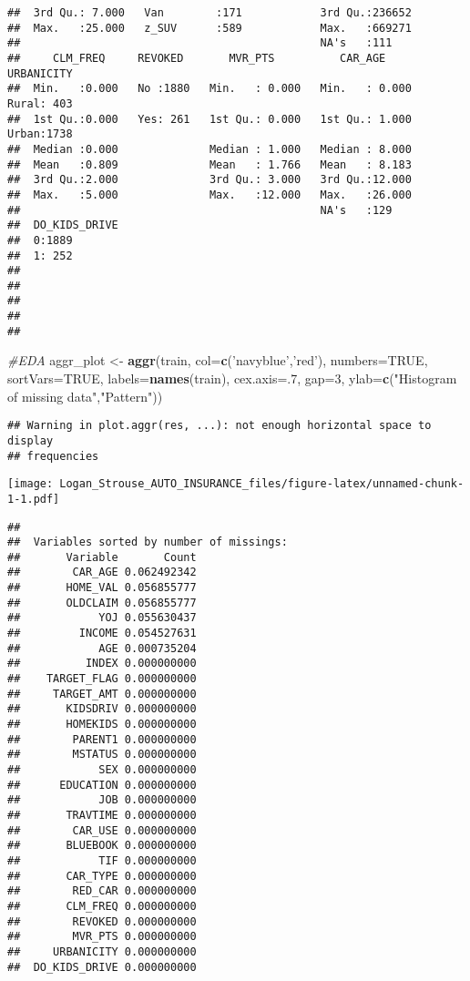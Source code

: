 \documentclass[]{article}
\newenvironment{Shaded}{\begin{snugshade}}{\end{snugshade}}
\newcommand{\CommentTok}[1]{\textcolor[rgb]{0.56,0.35,0.01}{\textit{#1}}}
\newcommand{\DataTypeTok}[1]{\textcolor[rgb]{0.13,0.29,0.53}{#1}}
\newcommand{\DecValTok}[1]{\textcolor[rgb]{0.00,0.00,0.81}{#1}}
\newcommand{\KeywordTok}[1]{\textcolor[rgb]{0.13,0.29,0.53}{\textbf{#1}}}
\newcommand{\NormalTok}[1]{#1}
\newcommand{\OtherTok}[1]{\textcolor[rgb]{0.56,0.35,0.01}{#1}}
\newcommand{\StringTok}[1]{\textcolor[rgb]{0.31,0.60,0.02}{#1}}
\begin{document}
\begin{verbatim}
##  3rd Qu.: 7.000   Van        :171            3rd Qu.:236652  
##  Max.   :25.000   z_SUV      :589            Max.   :669271  
##                                              NA's   :111     
##     CLM_FREQ     REVOKED       MVR_PTS          CAR_AGE       URBANICITY  
##  Min.   :0.000   No :1880   Min.   : 0.000   Min.   : 0.000   Rural: 403  
##  1st Qu.:0.000   Yes: 261   1st Qu.: 0.000   1st Qu.: 1.000   Urban:1738  
##  Median :0.000              Median : 1.000   Median : 8.000               
##  Mean   :0.809              Mean   : 1.766   Mean   : 8.183               
##  3rd Qu.:2.000              3rd Qu.: 3.000   3rd Qu.:12.000               
##  Max.   :5.000              Max.   :12.000   Max.   :26.000               
##                                              NA's   :129                  
##  DO_KIDS_DRIVE
##  0:1889       
##  1: 252       
##               
##               
##               
##               
## 
\end{verbatim}

\begin{Shaded}
\begin{Highlighting}[]
\CommentTok{#EDA}
\NormalTok{aggr_plot <-}\StringTok{ }\KeywordTok{aggr}\NormalTok{(train, }\DataTypeTok{col=}\KeywordTok{c}\NormalTok{(}\StringTok{'navyblue'}\NormalTok{,}\StringTok{'red'}\NormalTok{), }\DataTypeTok{numbers=}\OtherTok{TRUE}\NormalTok{, }\DataTypeTok{sortVars=}\OtherTok{TRUE}\NormalTok{, }\DataTypeTok{labels=}\KeywordTok{names}\NormalTok{(train), }\DataTypeTok{cex.axis=}\NormalTok{.}\DecValTok{7}\NormalTok{, }\DataTypeTok{gap=}\DecValTok{3}\NormalTok{, }\DataTypeTok{ylab=}\KeywordTok{c}\NormalTok{(}\StringTok{"Histogram of missing data"}\NormalTok{,}\StringTok{"Pattern"}\NormalTok{))}
\end{Highlighting}
\end{Shaded}

\begin{verbatim}
## Warning in plot.aggr(res, ...): not enough horizontal space to display
## frequencies
\end{verbatim}

\texttt{[image: Logan\_Strouse\_AUTO\_INSURANCE\_files/figure-latex/unnamed-chunk-1-1.pdf]}

\begin{verbatim}
## 
##  Variables sorted by number of missings: 
##       Variable       Count
##        CAR_AGE 0.062492342
##       HOME_VAL 0.056855777
##       OLDCLAIM 0.056855777
##            YOJ 0.055630437
##         INCOME 0.054527631
##            AGE 0.000735204
##          INDEX 0.000000000
##    TARGET_FLAG 0.000000000
##     TARGET_AMT 0.000000000
##       KIDSDRIV 0.000000000
##       HOMEKIDS 0.000000000
##        PARENT1 0.000000000
##        MSTATUS 0.000000000
##            SEX 0.000000000
##      EDUCATION 0.000000000
##            JOB 0.000000000
##       TRAVTIME 0.000000000
##        CAR_USE 0.000000000
##       BLUEBOOK 0.000000000
##            TIF 0.000000000
##       CAR_TYPE 0.000000000
##        RED_CAR 0.000000000
##       CLM_FREQ 0.000000000
##        REVOKED 0.000000000
##        MVR_PTS 0.000000000
##     URBANICITY 0.000000000
##  DO_KIDS_DRIVE 0.000000000
\end{verbatim}
\end{document}
